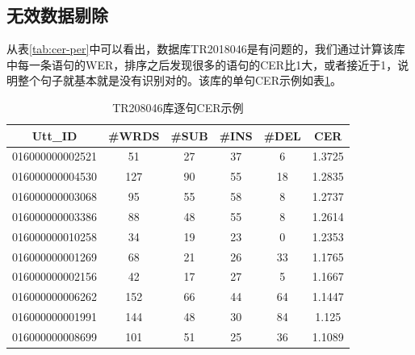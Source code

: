 \subsection{无效数据剔除}
从表\ref{tab:cer-per}中可以看出，数据库TR2018046是有问题的，我们通过计算该库中每一条语句的WER，排序之后发现很多的语句的CER比1大，或者接近于1，说明整个句子就基本就是没有识别对的。该库的单句CER示例如表\ref{tab:tr2018046}。
\begin{table}[h]
 \centering
 \caption{TR208046库逐句CER示例}
	 \begin{tabular*}{1\textwidth}{@{\extracolsep{\fill}}cccccc}
	 \toprule
		{\bf Utt\_ID  }  & {\bf #WRDS   } & {\bf #SUB    } & {\bf #INS    } & {\bf #DEL    } & {\bf CER} \\
	 \midrule
		016000000002521    & 	51     & 	27    &  	37    &  	6     &  	1.3725 \\
		016000000004530    & 	127    & 	90    &  	55    &  	18    &  	1.2835 \\
		016000000003068    & 	95     & 	55    &  	58    &  	8     &  	1.2737 \\
		016000000003386    & 	88     & 	48    &  	55    &  	8     &  	1.2614 \\
		016000000010258    & 	34     & 	19    &  	23    &  	0     &  	1.2353 \\
		016000000001269    & 	68     & 	21    &  	26    &  	33    &  	1.1765 \\
		016000000002156    & 	42     & 	17    &  	27    &  	5     &  	1.1667 \\
		016000000006262    & 	152    & 	66    &  	44    &  	64    &  	1.1447 \\
		016000000001991    & 	144    & 	48    &  	30    &  	84    &  	1.125  \\
		016000000008699    & 	101    & 	51    &  	25    &  	36    &  	1.1089 \\
	 \bottomrule
	 \end{tabular*}%
 \label{tab:tr2018046}%
\end{table}%


